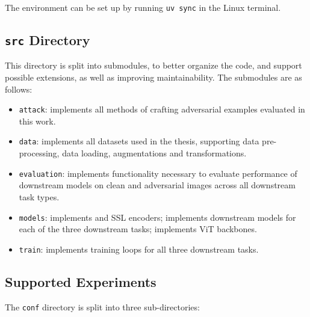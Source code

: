 The environment can be set up by running \texttt{uv sync} in the Linux terminal.

\subsection{\texttt{src} Directory}

This directory is split into submodules, to better organize the code, and support possible extensions, as well as improving maintainability. The submodules are as follows:

\begin{itemize}
    \item \texttt{attack}: implements all methods of crafting adversarial examples evaluated in this work.
    \item \texttt{data}: implements all datasets used in the thesis, supporting data pre-processing, data loading, augmentations and transformations.
    \item \texttt{evaluation}: implements functionality necessary to evaluate performance of downstream models on clean and adversarial images across all downstream task types.
    \item \texttt{models}: implements \DINOvone and \DINOvtwo SSL encoders; implements downstream models for each of the three downstream tasks; implements ViT backbones.
    \item \texttt{train}: implements training loops for all three downstream tasks.
\end{itemize}

\subsection{Supported Experiments}

The \texttt{conf} directory is split into three sub-directories:

